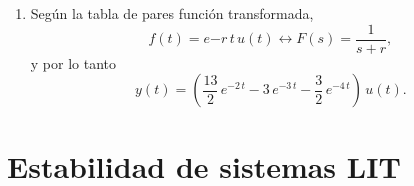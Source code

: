 \begin{enumerate}
\begin{equation}
\begin{array}{c}
\end{array}
(s + 2) \,  \frac{2 \, s^{2} + 20 \, s + 45}{(s + 2) \, (s + 3) \, (s + 4)}, 
    \end{equation}
    \begin{equation}
	A = \begin{array}{c}
		Lim \\
		s \rightarrow -2
	\end{array}
	(s + 2) \, Y(s) = 
	\begin{array}{c}
		Lim \\
		s \rightarrow -2
	\end{array}
	\frac{2 \, s^{2} + 20 \, s + 45}{(s + 3) \, (s + 4)} = \frac{13}{2}, 
\end{equation}
    \begin{equation}
	B = \begin{array}{c}
		Lim \\
		s \rightarrow -3
	\end{array}
	(s + 3) \, Y(s) = 
	\begin{array}{c}
		Lim \\
		s \rightarrow -3
	\end{array}
	\frac{2 \, s^{2} + 20 \, s + 45}{(s + 2) \, (s + 4)} = -3, 
\end{equation}
    \begin{equation}
	C = \begin{array}{c}
		Lim \\
		s \rightarrow -4
	\end{array}
	(s + 4) \, Y(s) = 
	\begin{array}{c}
		Lim \\
		s \rightarrow -4
	\end{array}
	\frac{2 \, s^{2} + 20 \, s + 45}{(s + 2) \, (s + 3)} = -\frac{3}{2}, 
\end{equation}
\item Según la tabla de pares función transformada,
\begin{equation}
	f(t) = e{-r \, t} \, u(t) \leftrightarrow F(s) = \frac{1}{s+r},
\end{equation}
y por lo tanto
\begin{equation}
	y(t) = \left(\frac{13}{2} \, e^{-2 \, t} - 3 \, e^{-3 \, t} - \frac{3}{2} \, e^{-4 \, t}\right) \, u(t).
\end{equation}
\end{enumerate}

\section{Estabilidad de sistemas LIT}


